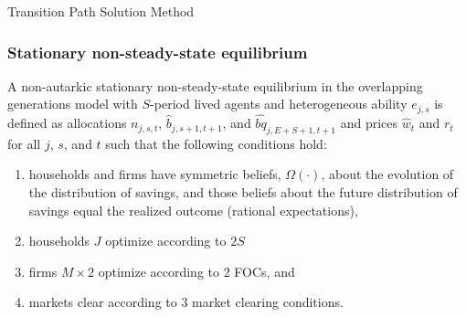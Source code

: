 \documentclass{beamer}
\begin{document}


  \begin{frame}{Transition Path Solution Method}\label{TPI Solution}
    \frametitle{Stationary non-steady-state equilibrium}
      \begin{definition}
        A non-autarkic stationary non-steady-state equilibrium in the overlapping generations model with $S$-period lived agents and heterogeneous ability $e_{j,s}$ is defined as allocations $n_{j,s,t}$, $\hat{b}_{j,s+1,t+1}$, and $\hat{bq}_{j,E+S+1,t+1}$ and prices $\hat{w}_t$ and $r_t$ for all $j$, $s$, and $t$ such that the following conditions hold:
        \begin{enumerate}
          \item households and firms have symmetric beliefs, $\Omega(\cdot)$, about the evolution of the distribution of savings, and those beliefs about the future distribution of savings equal the realized outcome (rational expectations),
          \item households $J$ optimize according to $2S$
          \item firms $M\times 2$ optimize according to 2 FOCs, and
          \item markets clear according to 3 market clearing conditions.
        \end{enumerate}
      \end{definition}
  \end{frame}
\end{document}
